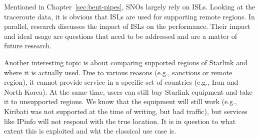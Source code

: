 Mentioned in Chapter~\ref{sec:bent-pipes}, \ac{SNO}s largely rely on \ac{ISL}s.
Looking at the traceroute data, it is obvious that \ac{ISL}s are used for
supporting remote regions. In parallel, research discusses the impact of
\ac{ISL}s on the performance. Their impact and ideal usage are questions that
need to be addressed and are a matter of future research.

Another interesting topic is about comparing supported regions of Starlink and
where it is actually used. Due to various reasons (e.g., sanctions or remote
region), it cannot provide service in a specific set of countries (e.g., Iran
and North Korea). At the same time, users can still buy Starlink equipment and
take it to unsupported regions. We know that the equipment will still work
(e.g., Kiribati was not supported at the time of writing, but had traffic), but
services like IPinfo will not respond with the true location. It is in question
to what extent this is exploited and wht the classical use case is.
